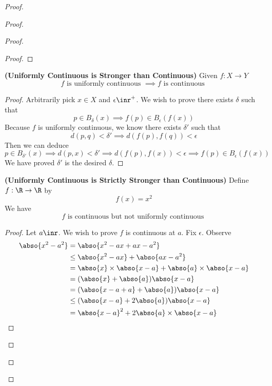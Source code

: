 \documentclass{report}
\begin{document}
\begin{proof}
\begin{proof}
\begin{proof}
\begin{proof}
\end{proof}
\begin{theorem}
\label{5.3.3}
\textbf{(Uniformly Continuous is Stronger than Continuous)} Given $f:X\rightarrow Y$
\begin{equation*}
f\text{ is uniformly continuous }\implies f\text{ is continuous }
\end{equation*}
\end{theorem}
\begin{proof}
Arbitrarily pick $x\in X$ and $\epsilon \inr^+$. We wish to prove there exists $\delta$ such that 
\begin{equation*}
p \in B_{\delta}(x)\implies f(p)\in B_{\epsilon }(f(x))
\end{equation*}
Because $f$ is uniformly continuous, we know there exists $\delta'$ such that 
\begin{equation*}
d(p,q)<\delta'\implies d(f(p),f(q))<\epsilon 
\end{equation*}
Then we can deduce 
\begin{equation*}
p\in B_{\delta'}(x)\implies d(p,x)<\delta ' \implies d(f(p),f(x))<\epsilon  \implies f(p)\in B_{\epsilon }(f(x))
\end{equation*}
We have proved $\delta'$ is the desired $\delta$. 
\end{proof}
\begin{theorem}
\label{5.3.4}
\textbf{(Uniformly Continuous is Strictly Stronger than Continuous)} Define $f:\R\rightarrow \R$ by
\begin{equation*}
f(x)=x^2
\end{equation*}
We have 
\begin{equation*}
f\text{ is continuous but not uniformly continuous }
\end{equation*}
\end{theorem}
\begin{proof}
Let $a\inr$. We wish to prove $f$ is continuous at  $a$. Fix  $\epsilon $. Observe 
\begin{align*}
  \abso{x^2-a^2}&=\abso{x^2-ax+ax-a^2}\\
  &\leq \abso{x^2-ax}+\abso{ax-a^2}\\
  &=\abso{x}\times\abso{x-a}+\abso{a}\times \abso{x-a}\\
  &=(\abso{x}+\abso{a})\abso{x-a}\\
  &=(\abso{x-a+a}+\abso{a})\abso{x-a}\\
  &\leq (\abso{x-a}+2\abso{a})\abso{x-a}\\
  &=\abso{x-a}^2 +2 \abso{a}\times \abso{x-a}

\end{align*}
\end{proof}
\end{proof}
\end{proof}
\end{proof}
\end{document}

